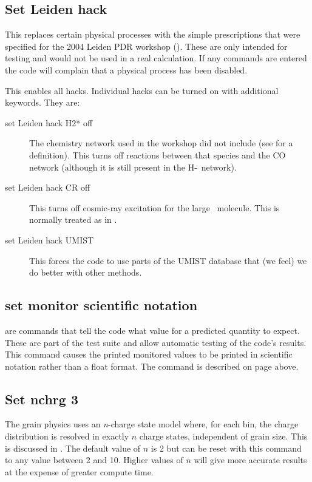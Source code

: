 \subsection{Set Leiden hack}

This replaces certain physical processes with the simple prescriptions
that were specified for the 2004 Leiden PDR workshop
(\citealp{Roellig2007}).
These are only intended for testing and would not be used
in a real calculation.
If any  commands are entered the code will
complain that a physical process has been disabled.

This enables all hacks.
Individual hacks can be turned on with additional keywords.
They are:

\begin{description}
\item[set Leiden hack H2* off]  The chemistry network used in the workshop did
not include \htwo* (see \citealp{Tielens1985a} for a definition).  This
turns off reactions between that species and the CO network (although it
is still present in the H-\htwo\ network).

\item[set Leiden hack CR off]  This turns off cosmic-ray excitation for the
large \htwo\ molecule.
This is normally treated as in \citet{Dalgarno1999}.

\item[set Leiden hack UMIST]  This forces the code to use parts of the UMIST
database that (we feel) we do better with other methods.
\end{description}

\subsection{set monitor scientific notation}
 are commands that
tell the code what value for a predicted quantity to expect.  These are
part of the test suite and allow automatic testing of the code's results.
This command causes the printed monitored values to be printed in scientific
notation rather than a float format.
The  command is described on page
\pageref{sec:CommandMonitor} above.

\subsection{Set nchrg 3}

The grain physics uses an \emph{n}-charge state model where, for each bin,
the charge distribution is resolved in exactly $n$ charge states,
independent of grain size.
This is discussed in \citet{VanHoof2004}.
The default
value of $n$ is 2 but can be reset with this command
to any value between 2 and 10.
Higher values of $n$ will give more accurate results at the expense
of greater compute time.

